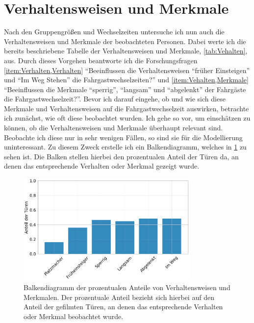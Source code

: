 \section{Verhaltensweisen und Merkmale} \label{Verhalten}
Nach den Gruppengrößen und Wechselzeiten untersuche ich nun auch die Verhaltensweisen und Merkmale der beobachteten Personen. Dabei werte ich die bereits beschriebene Tabelle der Verhaltensweisen und Merkmale, \tablename \ref{tab:Vehalten}, aus. Durch dieses Vorgehen beantworte ich die Forschungsfragen \ref{item:Verhalten,Verhalten} "`Beeinflussen die Verhaltensweisen "`früher Einsteigen"' und "`Im Weg Stehen"' die Fahrgastwechselzeiten?"' und \ref{item:Vehalten,Merkmale} "`Beeinflussen die Merkmale "`sperrig"', "`langsam"' und "`abgelenkt"' der Fahrgäste die Fahrgastwechselzeit?"'. Bevor ich darauf eingehe, ob und wie sich diese Merkmale und Verhaltensweisen auf die Fahrgastwechselzeit auswirken, betrachte ich zunächst, wie oft diese beobachtet wurden. Ich gehe so vor, um einschätzen zu können, ob die Verhaltensweisen und Merkmale überhaupt relevant sind. Beobachte ich diese nur in sehr wenigen Fällen, so sind sie für die Modellierung uninteressant. Zu diesem Zweck erstelle ich ein Balkendiagramm, welches in \figurename \ref{fig:BalkenVerhalten} zu sehen ist. Die Balken stellen hierbei den prozentualen Anteil der Türen da, an denen das entsprechende Verhalten oder Merkmal gezeigt wurde.
\begin{figure}[H]
	\centering
		\includegraphics[width=0.8\textwidth]{pictures/data_evaluation/behavior/counts_behavoirs.png}
	\caption{Balkendiagramm der prozentualen Anteile von Verhaltensweisen und Merkmalen. Der prozentuale Anteil bezieht sich hierbei auf den Anteil der gefilmten Türen, an denen das entsprechende Verhalten oder Merkmal beobachtet wurde.}
	\label{fig:BalkenVerhalten}
\end{figure}
